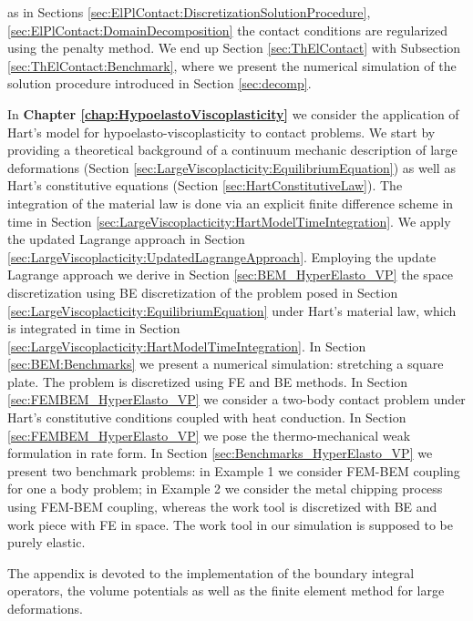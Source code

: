 as in Sections \ref{sec:ElPlContact:DiscretizationSolutionProcedure}, \ref{sec:ElPlContact:DomainDecomposition} the contact conditions are regularized using the penalty method. We end up Section \ref{sec:ThElContact} with Subsection \ref{sec:ThElContact:Benchmark}, where we present the numerical simulation of the solution procedure introduced in Section \ref{sec:decomp}.


In \textbf{Chapter \ref{chap:HypoelastoViscoplasticity}} we consider the application of Hart's model for hypoelasto-viscoplasticity to  contact problems. We start by providing a theoretical background of a continuum mechanic description of large deformations (Section \ref{sec:LargeViscoplacticity:EquilibriumEquation}) as well as Hart's constitutive equations (Section \ref{sec:HartConstitutiveLaw}). The integration of the material law is done via an explicit finite difference scheme in time in Section \ref{sec:LargeViscoplacticity:HartModelTimeIntegration}. We apply the updated Lagrange approach in Section \ref{sec:LargeViscoplacticity:UpdatedLagrangeApproach}. Employing the update Lagrange approach we derive in Section \ref{sec:BEM_HyperElasto_VP}  the space discretization using BE discretization of the problem posed in Section \ref{sec:LargeViscoplacticity:EquilibriumEquation} under Hart's material law, which  is integrated in time in Section \ref{sec:LargeViscoplacticity:HartModelTimeIntegration}. In Section \ref{sec:BEM:Benchmarks} we present a  numerical simulation: stretching a square plate. The problem is discretized using FE and BE methods. In Section \ref{sec:FEMBEM_HyperElasto_VP} we consider a two-body contact problem under Hart's constitutive conditions coupled with heat conduction. In Section \ref{sec:FEMBEM_HyperElasto_VP} we pose the thermo-mechanical weak formulation in rate form. In Section \ref{sec:Benchmarks_HyperElasto_VP} we present two benchmark problems: in Example 1 we consider  FEM-BEM coupling for one a body problem; in Example 2 we consider the metal chipping process using FEM-BEM coupling, whereas the work tool is discretized with BE and work piece with FE in space. The work tool in our simulation is supposed to be purely elastic. 

The appendix is devoted to the implementation of the boundary integral operators, the volume potentials as well as the finite element method for large deformations. 
